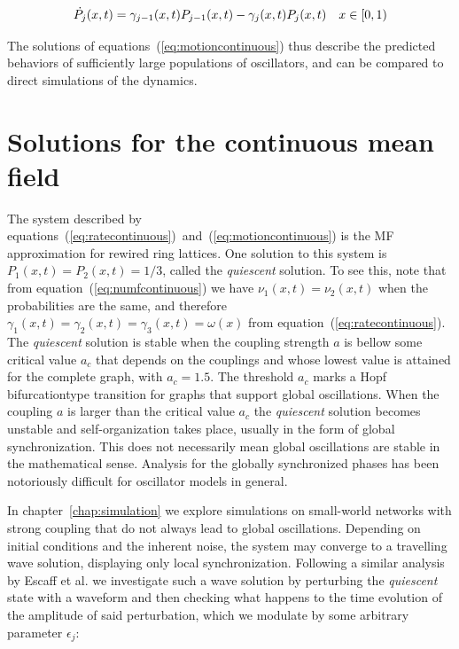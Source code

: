 \begin{align}
  \dot{P_j}(x,t) &= \gamma_{j-1}(x,t)P_{j-1}(x,t) - \gamma_j(x,t)P_j(x,t) & x\in[0,1)
  \label{eq:motioncontinuous}
\end{align}

The solutions of equations~(\ref{eq:motioncontinuous}) thus describe the predicted behaviors of sufficiently large populations of
oscillators, and can be compared to direct simulations of the dynamics.

\section{Solutions for the continuous mean field}

The system described by equations~(\ref{eq:ratecontinuous})~and~(\ref{eq:motioncontinuous}) is the MF approximation for rewired ring
lattices. One solution to this system is $P_1(x,t)=P_2(x,t)=1/3$, called the \textit{quiescent} solution. To see this, note that from
equation~(\ref{eq:numfcontinuous}) we have $\nu_1(x,t) = \nu_2(x,t)$ when the probabilities are the same, and therefore $\gamma_1(x,t)
= \gamma_2(x,t) = \gamma_3(x,t)=\omega(x)$ from equation~(\ref{eq:ratecontinuous}). The \textit{quiescent} solution is stable when the
coupling strength $a$ is bellow some critical value $a_c$ that depends on the couplings and whose lowest value is attained for the
complete graph, with $a_c=1.5$. The threshold $a_c$ marks a Hopf bifurcation\footnotemark type transition for graphs that support
global oscillations\cite{Wood06a}\cite{rodrigues2020synchronization}\cite{Wood06b}\cite{Wood07b}. When the coupling $a$ is larger than
the critical value $a_c$ the \textit{quiescent} solution becomes unstable and self-organization takes place, usually in the form of
global synchronization. This does not necessarily mean global oscillations are stable in the mathematical sense. Analysis for the
globally synchronized phases has been notoriously difficult for oscillator models in general.


In chapter~\ref{chap:simulation} we explore simulations on small-world networks with strong coupling that do not always lead to global
oscillations. Depending on initial conditions and the inherent noise, the system may converge to a travelling wave solution, displaying
only local synchronization. Following a similar analysis by Escaff et al.\cite{escaff2014arrays} we investigate such a wave solution by
perturbing the \textit{quiescent} state with a waveform and then checking what happens to the time evolution of the amplitude of said
perturbation, which we modulate by some arbitrary parameter $\epsilon_j$:

